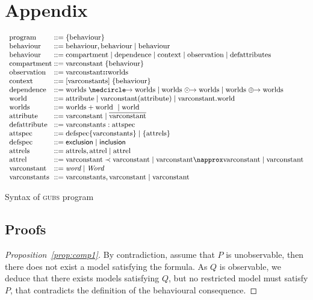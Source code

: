 \documentclass{eptcs}
\newcounter{ti}
\begin{document}
\section*{Appendix}
\begin{table}[ht]
$$
\small
\begin{array}{l @{\; ::= \;} l}
\text{program} & \{ \text{behaviour} \} \\
\text{behaviour} & \text{behaviour}, \text{behaviour} \;|\; \text{behaviour} \\ \text{behaviour} & \text{compartment} \; |\; \text{dependence} \;|\; \text{context} \;|\; \text{observation} \;|\; \text{defattributes}\\ 
\text{compartment} & \text{varconstant} \; \{\text{behaviour} \}\\
\text{observation} & \text{varconstant} \textbf{::} \text{worlds} \\
\text{context} & \context{\text{varconstants}} \; \{\text{behaviour} \}\\
\text{dependence} & \text {worlds} \cause \text{worlds} \; | \; \text{worlds} \pcause \text{worlds} \; | \; \text{worlds} \remcause \text{worlds} \\
\text{world } & \text{attribute} \;|\; \text{varconstant} (\text{attribute}) \;|\; \text{varconstant}.\text{world } \\
\text{worlds} & \text{worlds} + \text{world } \;|\; \text{world } \\
\text{attribute} & \text{varconstant} \;|\; \overline{\text{varconstant}}\\
\text{defattribute} & \text{varconstants} : \text{attspec} \\ 
\text{attspec} & \text{defspec} \{ \text{varconstants} \} \;|\; \{ \text{attrels} \} \\
\text{defspec} & \textsf{exclusion} \;|\; \textsf{inclusion} \\
\text{attrels} & \text{attrels}, \text{attrel} \;|\; \text{attrel} \\
\text{attrel} & \text{varconstant} \prec \text{varconstant} \;|\; \text{varconstant} \napprox \text{varconstant} \;|\; \text{varconstant}\\
\text{varconstant} & \textit{word} \; | \; \textit{Word}\\
\text{varconstants} & \text{varconstants}, \text{varconstant} \;|\; \text{varconstant} 
\end{array}
$$
\label{tab:syntax}
\caption{Syntax of \textsc{gubs} program}
\end{table}
\subsection*{Proofs}
\begin{proof}[Proposition~\ref{prop:comp1}]
By contradiction, assume that $P$ is unobservable, then there does not exist a model satisfying the formula. As $Q$ is observable, we deduce that there exists models satisfying $Q$, but no restricted model must satisfy $P$, that contradicts the definition of the behavioural consequence.
\end{proof}
\end{document}
